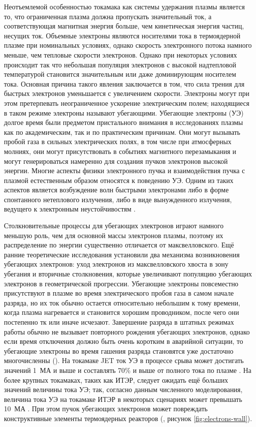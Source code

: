
{\actuality}

Неотъемлемой особенностью токамака как системы удержания плазмы является то, что ограниченная плазма должна пропускать значительный ток, а соответствующая магнитная энергия больше, чем кинетическая энергия частиц, несущих ток. Объемные электроны являются носителями тока в термоядерной плазме при номинальных условиях, однако скорость электронного потока намного меньше, чем тепловые скорости электронов. Однако при некоторых условиях происходит так что небольшая популяция электронов с высокой надтепловой температурой становится значительным или даже доминирующим носителем тока. Основная причина такого явления заключается в том, что сила трения для быстрых электронов уменьшается с увеличением скорости. Электроны могут при этом претерпевать неограниченное ускорение электрическим полем; находящиеся в таком режиме электроны называют убегающими. Убегающие электроны (УЭ) долгое время были предметом пристального внимания в исследованиях плазмы как по академическим, так и по практическим причинам. Они могут вызывать пробой газа в сильных электрических полях, в том числе при атмосферных молниях, они могут присутствовать в событиях магнитного перезамыкания и могут генерироваться намеренно для создания пучков электронов высокой энергии. Многие аспекты физики электронного пучка и взаимодействия пучка с плазмой естественным образом относятся к поведению УЭ. Одним из таких аспектов является возбуждение волн быстрыми электронами либо в форме спонтанного нетеплового излучения, либо в виде вынужденного излучения, ведущего к электронным неустойчивостям \cite{Breizman2019}.

Столкновительные процессы для убегающих электронов играют намного меньшую роль, чем для основной массы электронов плазмы, поэтому их распределение по энергии существенно отличается от максвелловского. Ещё ранние теоретические исследования установили два механизма возникновения убегающих электронов: уход электронов из максвелловского хвоста в зону убегания и вторичные столкновения, которые увеличивают популяцию убегающих электронов в геометрической прогрессии. Убегающие электроны повсеместно присутствуют в плазме во время электрического пробоя газа в самом начале разряда, но их ток обычно остается относительно небольшим к тому времени, когда плазма нагревается и становится хорошим проводником, после чего они постепенно тк или иначе исчезают. Завершение разряда в штатных режимах работы обычно не вызывает повторного рождения убегающих электронов, однако если время отключения должно быть очень коротким в аварийной ситуации, то убегающие электроны во время гашения разряда становятся уже достаточно многочисленны (\cite{Breizman2019}). На токамаке JET ток УЭ в процессе срыва может достигать значений 1~МА и выше и составлять 70\% и выше от полного тока по плазме \autocite{Smith2006}. На более крупных токамаках, таких как ИТЭР, следует ожидать ещё больших значений величины тока УЭ; так, согласно данным численного моделирования, величина тока УЭ на токамаке ИТЭР в некоторых сценариях может превышать 10~МА \cite{Smith2006}. При этом пучок убегающих электронов может повреждать конструктивные элементы термоядерных реакторов (\autocite{Bazylev2011}, рисунок \cref{fig:electrons-wall}).

